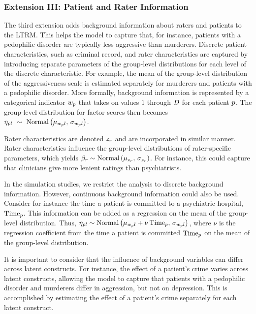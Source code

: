 \documentclass[a4paper,usenames,dvipsnames]{article}
\begin{document}
\subsubsection*{Extension III: Patient and Rater Information}
The third extension adds background information about raters and patients to the LTRM. This helps the model to capture that, for instance, patients with a pedophilic disorder are typically less aggressive than murderers. Discrete patient characteristics, such as criminal record,  and rater characteristics are captured by introducing separate parameters of the group-level distributions for each level of the discrete characteristic. For example, the mean of the group-level distribution of the aggressiveness scale is estimated separately for murderers and patients with a pedophilic disorder. More formally, background information is represented by a categorical indicator $w_{p}$ that takes on values $1$ through $\TdiscreteP$ for each patient $p$. The group-level distribution for factor scores then becomes $\eta_{pl}~\sim~\text{Normal}\left(\mu_{w_pl},\,\sigma_{w_pl}\right)$.

 Rater characteristics are denoted $z_r$ and are incorporated in similar manner. Rater characteristics influence the group-level distributions of rater-specific parameters, which yields $\beta_r \sim \text{Normal}\left(\mu_{z_r},\,\sigma_{z_r}\right)$. For instance, this could capture that clinicians give more lenient ratings than psychiatrists.

In the simulation studies, we restrict the analysis to discrete background information. However, continuous background information could also be used. Consider for instance the time a patient is committed to a psychiatric hospital, $\mathrm{Time}_p$.  This information can be added as a regression on the mean of the group-level distribution. Thus, $\eta_{pl} \sim \text{Normal}\left(\mu_{w_pl} + \nu\,\mathrm{Time}_p,\,\sigma_{w_pl}\right)$, where $\nu$ is the regression coefficient from the time a patient is committed $\mathrm{Time}_p$ on the mean of the group-level distribution.

It is important to consider that the influence of background variables can differ across latent constructs. For instance, the effect of a patient's crime varies across latent constructs, allowing the model to capture that patients with a pedophilic disorder and murderers differ in aggression, but not on depression. This is accomplished by estimating the effect of a patient's crime separately for each latent construct.
\end{document}
